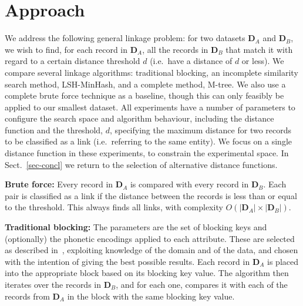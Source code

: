 \documentclass{llncs}
\begin{document}
\section{Approach}
\label{sec-approach}

We address the following general linkage problem: for two datasets
$\mathbf{D}_A$ and $\mathbf{D}_B$, we wish to find, for each record in
$\mathbf{D}_A$, all the records in $\mathbf{D}_B$ that match it with
regard to a certain distance threshold $d$ (i.e.\ have a distance of $d$
or less). We compare several linkage algorithms: traditional blocking,
an incomplete similarity search method, LSH-MinHash, and a complete
method, M-tree. We also use a complete brute force technique as a
baseline, though this can only feasibly be applied to our smallest
dataset. All experiments have a number of parameters to configure the
search space and algorithm behaviour, including the distance function
and the threshold, $d$, specifying the maximum distance for two records
to be classified as a link (i.e.\ referring to the same entity). We
focus on a single distance function in these experiments, to constrain
the experimental space. In Sect.~\ref{sec-concl} we return to the
selection of alternative distance functions.

\textbf{Brute force:} Every record in $\mathbf{D}_A$ is compared with
every record in $\mathbf{D}_B$. Each pair is classified as a link if the
distance between the records is less than or equal to the threshold.
This always finds all links, with complexity $ O(|\mathbf{D}_A| \times
|\mathbf{D}_B|)$.

\textbf{Traditional blocking:} The parameters are the set of blocking
keys and (optionally) the phonetic encodings applied to each attribute.
These are selected as described in~\cite{Chr12b}, exploiting knowledge
of the domain and of the data, and chosen with the intention of giving
the best possible results. Each record in $\mathbf{D}_A$ is placed into
the appropriate block based on its blocking key value. The algorithm
then iterates over the records in $\mathbf{D}_B$, and for each one,
compares it with each of the records from $\mathbf{D}_A$ in the block
with the same blocking key value.
\end{document}
